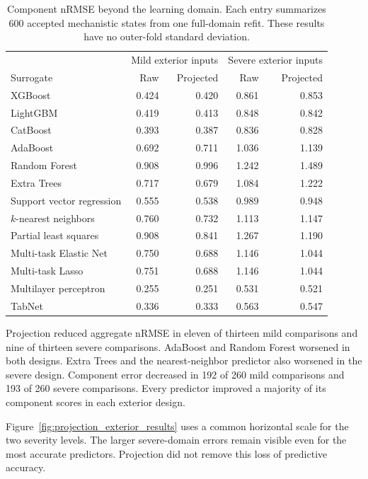 \begin{table}[htbp]
\centering\small
\caption{Component nRMSE beyond the learning domain. Each entry summarizes 600 accepted mechanistic states from one full-domain refit. These results have no outer-fold standard deviation.}
\label{tab:projection_exterior_results}
\begin{tabular}{p{4.5cm}rrrr}
\toprule
& \multicolumn{2}{c}{Mild exterior inputs} & \multicolumn{2}{c}{Severe exterior inputs}\\
Surrogate & Raw & Projected & Raw & Projected\\
\midrule
XGBoost & 0.424 & 0.420 & 0.861 & 0.853\\
LightGBM & 0.419 & 0.413 & 0.848 & 0.842\\
CatBoost & 0.393 & 0.387 & 0.836 & 0.828\\
AdaBoost & 0.692 & 0.711 & 1.036 & 1.139\\
Random Forest & 0.908 & 0.996 & 1.242 & 1.489\\
Extra Trees & 0.717 & 0.679 & 1.084 & 1.222\\
Support vector regression & 0.555 & 0.538 & 0.989 & 0.948\\
$k$-nearest neighbors & 0.760 & 0.732 & 1.113 & 1.147\\
Partial least squares & 0.908 & 0.841 & 1.267 & 1.190\\
Multi-task Elastic Net & 0.750 & 0.688 & 1.146 & 1.044\\
Multi-task Lasso & 0.751 & 0.688 & 1.146 & 1.044\\
Multilayer perceptron & 0.255 & 0.251 & 0.531 & 0.521\\
TabNet & 0.336 & 0.333 & 0.563 & 0.547\\
\bottomrule
\end{tabular}
\end{table}

Projection reduced aggregate nRMSE in eleven of thirteen mild comparisons and nine of thirteen severe comparisons. AdaBoost and Random Forest worsened in both designs. Extra Trees and the nearest-neighbor predictor also worsened in the severe design. Component error decreased in 192 of 260 mild comparisons and 193 of 260 severe comparisons. Every predictor improved a majority of its component scores in each exterior design.

Figure~\ref{fig:projection_exterior_results} uses a common horizontal scale for the two severity levels. The larger severe-domain errors remain visible even for the most accurate predictors. Projection did not remove this loss of predictive accuracy.

